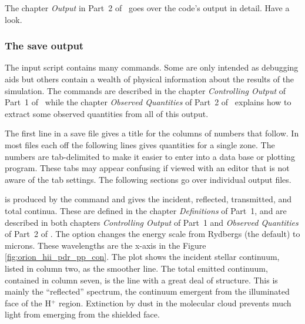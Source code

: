 \documentclass[12pt,twoside]{article}
\begin{document}
{The chapter \emph{Output} in Part~2 of \Hazy\ goes over
the code's output in detail.
Have a look.

\subsubsection{The save output}

The input script contains many 
commands.  Some are only intended
as debugging aids but others contain a wealth of physical information about
the results of the simulation.  The 
commands are described in the
chapter \emph{Controlling Output} of Part~1
of \Hazy\ while the chapter
\emph{Observed Quantities} of Part~2 of \Hazy\ explains
how to extract some observed quantities
from all of this output.

The first line in a save file gives a title for the columns of numbers
that follow.
In most files each off the following lines gives quantities for a single zone.
The numbers are tab-delimited to make it easier to enter into a data base
or plotting program.  These tabs may appear confusing if viewed with an
editor that is not aware of the tab settings.  The following sections go
over individual output files.

 is produced
by the  command and gives
the incident, reflected, transmitted, and total continua.  These are defined
in the chapter \emph{Definitions} of Part~1,
and are described in both chapters
\emph{Controlling Output} of Part~1 and
\emph{Observed Quantities} of Part~2 of \Hazy.
The  option changes the energy
scale from Rydbergs (the default) to
microns.
These wavelengths are the x-axis in the
Figure \ref{fig:orion_hii_pdr_pp_con}.
The
plot shows the incident stellar continuum, listed in column two, as the
smoother line.  The total emitted continuum, contained in column seven,
is the line with a great deal of structure.  This is mainly the ``reflected''
spectrum, the continuum emergent from the
illuminated face of the H$^+$ region.
Extinction by dust in the molecular cloud prevents much light from emerging
from the shielded face.

}
\end{document}
